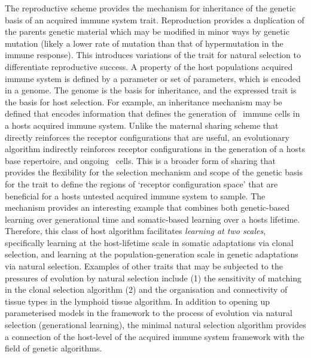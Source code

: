 The reproductive scheme provides the mechanism for inheritance of the genetic basis of an acquired immune system trait. Reproduction provides a duplication of the parents genetic material which may be modified in minor ways by genetic mutation (likely a lower rate of mutation than that of hypermutation in the immune response). This introduces variations of the trait for natural selection to differentiate reproductive success. A property of the host populations acquired immune system is defined by a parameter or set of parameters, which is encoded in a genome. The genome is the basis for inheritance, and the expressed trait is the basis for host selection. For example, an inheritance mechanism may be defined that encodes information that defines the generation of \naive\ immune cells in a hosts acquired immune system. Unlike the maternal sharing scheme that directly reinforces the receptor configurations that are useful, an evolutionary algorithm indirectly reinforces receptor configurations in the generation of a hosts base repertoire, and ongoing \naive\ cells. This is a broader form of sharing that provides the flexibility for the selection mechanism and scope of the genetic basis for the trait to define the regions of `receptor configuration space' that are beneficial for a hosts untested acquired immune system to sample. The mechanism provides an interesting example that combines both genetic-based learning over generational time and somatic-based learning over a hosts lifetime. Therefore, this class of host algorithm facilitates \emph{learning at two scales}, specifically learning at the host-lifetime scale in somatic adaptations via clonal selection, and learning at the population-generation scale in genetic adaptations via natural selection. Examples of other traits that may be subjected to the pressures of evolution by natural selection include (1) the sensitivity of matching in the clonal selection algorithm (2) and the organisation and connectivity of tissue types in the lymphoid tissue algorithm. In addition to opening up parameterised models in the framework to the process of evolution via natural selection (generational learning), the minimal natural selection algorithm provides a connection of the host-level of the acquired immune system framework with the field of genetic algorithms.

